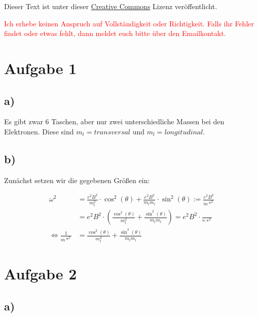




\maketitle

Dieser Text ist unter dieser \href{http://creativecommons.org/licenses/by-nc-sa/4.0/}{Creative Commons} Lizenz veröffentlicht.

\textcolor{red}{Ich erhebe keinen Anspruch auf Vollständigkeit oder Richtigkeit. Falls ihr Fehler findet oder etwas fehlt, dann meldet euch bitte über den Emailkontakt.}

\tableofcontents


\newpage



\section{Aufgabe 1}

\subsection*{a)}

Es gibt zwar 6 Taschen, aber nur zwei unterschiedliche Massen bei den Elektronen. Diese sind $m_t = transversal$ und $m_l = longitudinal$.


\subsection*{b)}

Zunächst setzen wir die gegebenen Größen ein:


\begin{align*}
\omega^2 &= \frac{e^2 B^2}{m_t^2} \cdot \cos^2(\theta) + \frac{e^2 B^2}{m_t m_l} \cdot \sin^2(\theta) := \frac{e^2 B^2}{m*^2} \\
&= e^2 B^2 \cdot \left( \frac{\cos^2(\theta)}{m_t^2} + \frac{\sin^2(\theta)}{m_t m_l} \right) = e^2 B^2 \cdot \frac{}{^m*^2} \\
\Leftrightarrow \frac{1}{m*^2} &= \frac{\cos^2(\theta)}{m_t^2} + \frac{\sin^2(\theta)}{m_t m_l}
\end{align*}


\section{Aufgabe 2}

\subsection*{a)}

